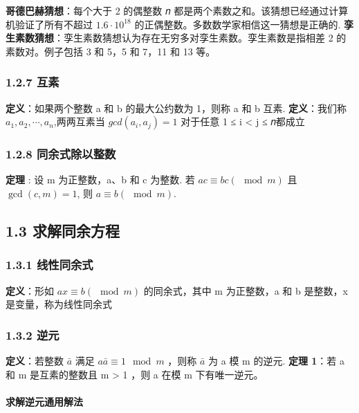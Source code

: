 \textbf{哥德巴赫猜想}：每个大于 2 的偶整数 𝑛
都是两个素数之和。该猜想已经通过计算机验证了所有不超过
\(1.6\cdot 10^{18}\) 的正偶整数。多数数学家相信这一猜想是正确的.
\textbf{孪生素数猜想}：孪生素数猜想认为存在无穷多对孪生素数。孪生素数是指相差
2 的素数对。例子包括 3 和 5，5 和 7，11 和 13 等。

\subsubsection{1.2.7 互素}\label{ux4e92ux7d20}

\textbf{定义}：如果两个整数 a 和 b 的最大公约数为 1，则称 a 和 b 互素.
\textbf{定义}：我们称 \(a_1, a_2, ⋯ , a_n\),两两互素当
\(gcd(a_i, a_j) = 1\) 对于任意 1 ≤ i \textless{} j ≤ 𝑛都成立

\subsubsection{1.2.8
同余式除以整数}\label{ux540cux4f59ux5f0fux9664ux4ee5ux6574ux6570}

\textbf{定理} : 设 m 为正整数，a、b 和 c 为整数. 若
\(ac \equiv bc (\mod m)\) 且 \(\gcd(c, m) = 1\), 则
\(a \equiv b (\mod m)\).

\subsection{1.3
求解同余方程}\label{ux6c42ux89e3ux540cux4f59ux65b9ux7a0b}

\subsubsection{1.3.1 线性同余式}\label{ux7ebfux6027ux540cux4f59ux5f0f}

\textbf{定义}：形如 \(ax \equiv b(\mod  m)\) 的同余式，其中 m
为正整数，a 和 b 是整数，x 是变量，称为线性同余式

\subsubsection{1.3.2 逆元}\label{ux9006ux5143}

\textbf{定义}：若整数 \(\bar a\) 满足 \(a\bar a \equiv 1\mod m\) ，则称
\(\bar a\) 为 a 模 m 的逆元. \textbf{定理 1}：若 a 和 m 是互素的整数且 m
\textgreater{} 1 ，则 a 在模 m 下有唯一逆元。

\paragraph{求解逆元通用解法}\label{ux6c42ux89e3ux9006ux5143ux901aux7528ux89e3ux6cd5}


